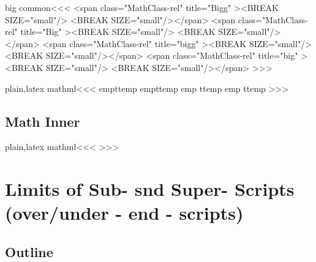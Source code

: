 {\<big common\><<<
   {\bgroup
          {<span class="MathClass-rel" title="Bigg" ><BREAK SIZE="small"/>}
          {<BREAK SIZE="small"/></span>}
          {}%
   }
   {\egroup}
   {\bgroup
          {<span class="MathClass-rel" title="Big" ><BREAK SIZE="small"/>}
          {<BREAK SIZE="small"/></span>}
          {}%
   }
   {\egroup}
   {\bgroup
          {<span class="MathClass-rel" title="bigg" ><BREAK SIZE="small"/>}
          {<BREAK SIZE="small"/></span>}
          {}%
   }
   {\egroup}
   {\bgroup
          {<span class="MathClass-rel" title="big" ><BREAK SIZE="small"/>}
          {<BREAK SIZE="small"/></span>}
          {}%
   }
   {\egroup}
>>>

\<plain,latex mathml\><<<
\edef\:temp{\noexpand{}}\:temp
\edef\:temp{\noexpand{}}\:temp
\edef\:temp{\noexpand
   }\:temp
\edef\:temp{\noexpand
   }\:temp
>>>


\subsection{Math Inner}


\<plain,latex mathml\><<<
\def\mathinner#1{\Tg<span
   class="mathinner">#1\Tg</span>}
>>>





\section{Limits of Sub- snd Super- Scripts (over/under - end - scripts)}


\subsection{Outline}


}
